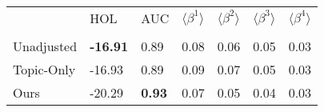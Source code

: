 \begin{tabular}{lllllll}
\toprule
{} &              HOL &            AUC & $\langle\beta^1\rangle$ & $\langle\beta^2\rangle$ & $\langle\beta^3\rangle$ & $\langle\beta^4\rangle$ \\
           &                  &                &                         &                         &                         &                         \\
\midrule
Unadjusted &  \textbf{-16.91} &           0.89 &                    0.08 &                    0.06 &                    0.05 &                    0.03 \\
Topic-Only &           -16.93 &           0.89 &                    0.09 &                    0.07 &                    0.05 &                    0.03 \\
Ours       &           -20.29 &  \textbf{0.93} &                    0.07 &                    0.05 &                    0.04 &                    0.03 \\
\bottomrule
\end{tabular}
